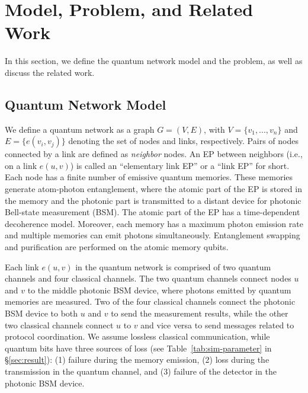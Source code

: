 \section{Model, Problem, and Related Work}
\label{sec:problem}

In this section, we define the quantum network model and the problem, as well as discuss the related work.

\subsection{Quantum Network Model} 
We define a quantum network as a graph $G=(V, E)$, with $V=\{v_1, ..., v_n\}$ and $E=\{e(v_i, v_j)\}$ denoting the set of nodes and links, respectively.
Pairs of nodes connected by a link are defined as \emph{neighbor} nodes.
An EP between neighbors (i.e., on a link $e(u, v)$) is called an ``elementary link EP'' or a ``link EP'' for short.
Each node has a finite number of emissive quantum memories.
These memories generate atom-photon entanglement, where the atomic part of the EP is stored in the memory and the photonic part is transmitted to a distant device for photonic Bell-state measurement (BSM).
The atomic part of the EP has a time-dependent decoherence model.
Moreover, each memory has a maximum photon emission rate and multiple memories can emit photons simultaneously.
Entanglement swapping and purification are performed on the atomic memory qubits.

Each link $e(u, v)$ in the quantum network is comprised of two quantum channels and four classical channels.
The two quantum channels connect nodes $u$ and $v$ to the middle photonic BSM device, where photons emitted by quantum memories are measured.
Two of the four classical channels connect the photonic BSM device to both $u$ and $v$ to send the measurement results,
while the other two classical channels connect $u$ to $v$ and vice versa to send messages related to protocol coordination.
We assume lossless classical communication, while quantum bits have three sources of loss (see Table~\ref{tab:sim-parameter} in \S\ref{sec:result}): (1) failure during the memory emission, (2) loss during the transmission in the quantum channel, and (3) failure of the detector in the photonic BSM device. 




